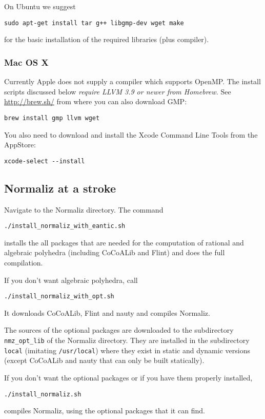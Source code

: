 \documentclass[12pt,a4paper]{scrartcl}
\theoremstyle{definition}
\begin{document}
On Ubuntu we suggest
\begin{Verbatim}
sudo apt-get install tar g++ libgmp-dev wget make
\end{Verbatim}
for the basic installation of the required libraries (plus compiler).

\subsubsection{Mac OS X}\label{mac}

Currently Apple does not supply a compiler which supports OpenMP.
The install scripts discussed below \emph{require LLVM 3.9 or newer from Homebrew.} See
\url{http://brew.sh/} from where you can also download GMP:

\begin{Verbatim}
brew install gmp llvm wget
\end{Verbatim}

You also need to download and install the Xcode Command Line Tools from the AppStore:
\begin{Verbatim}
xcode-select --install
\end{Verbatim} 

\subsection{Normaliz at a stroke}\label{stroke}

Navigate to the Normaliz directory. The command
\begin{Verbatim}
./install_normaliz_with_eantic.sh
\end{Verbatim}
installs the all packages that are needed for the computation of rational and algebraic polyhedra (including CoCoALib and Flint) and does the full compilation.

If you don't want algebraic polyhedra, call
\begin{Verbatim}
./install_normaliz_with_opt.sh
\end{Verbatim}
It downloads CoCoALib, Flint and nauty and compiles Normaliz.

The sources of the optional packages are downloaded to the subdirectory \verb|nmz_opt_lib| of the Normaliz directory. They are installed in the subdirectory \verb|local| (imitating \verb|/usr/local|) where they exist in static and dynamic versions (except CoCoALib and nauty that can only be built statically).

If you don't want the optional packages or if you have them properly installed,
\begin{Verbatim}
./install_normaliz.sh
\end{Verbatim}
compiles Normaliz, using the optional packages that it can find. 
\end{document}
